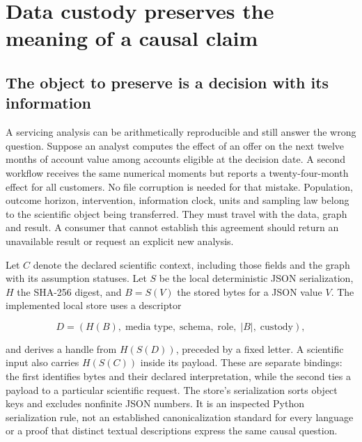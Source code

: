 \hypertarget{data-custody-preserves-the-meaning-of-a-causal-claim}{%
\section{Data custody preserves the meaning of a causal
claim}\label{data-custody-preserves-the-meaning-of-a-causal-claim}}

\label{exec14:artifact-custody}

\hypertarget{the-object-to-preserve-is-a-decision-with-its-information}{%
\subsection{The object to preserve is a decision with its
information}\label{the-object-to-preserve-is-a-decision-with-its-information}}

A servicing analysis can be arithmetically reproducible and still answer
the wrong question. Suppose an analyst computes the effect of an offer
on the next twelve months of account value among accounts eligible at
the decision date. A second workflow receives the same numerical moments
but reports a twenty-four-month effect for all customers. No file
corruption is needed for that mistake. Population, outcome horizon,
intervention, information clock, units and sampling law belong to the
scientific object being transferred. They must travel with the data,
graph and result. A consumer that cannot establish this agreement should
return an unavailable result or request an explicit new analysis.

Let \(C\) denote the declared scientific context, including those fields
and the graph with its assumption statuses. Let \(S\) be the local
deterministic JSON serialization, \(H\) the SHA-256 digest, and
\(B=S(V)\) the stored bytes for a JSON value \(V\). The implemented
local store uses a descriptor

\[
D=(H(B),\;\text{media type},\;\text{schema},\;\text{role},\;|B|,\;\text{custody}),
\]

and derives a handle from \(H(S(D))\), preceded by a fixed letter. A
scientific input also carries \(H(S(C))\) inside its payload. These are
separate bindings: the first identifies bytes and their declared
interpretation, while the second ties a payload to a particular
scientific request. The store's serialization sorts object keys and
excludes nonfinite JSON numbers. It is an inspected Python serialization
rule, not an established canonicalization standard for every language or
a proof that distinct textual descriptions express the same causal
question.~\citep{exec14_custody_implementation}

